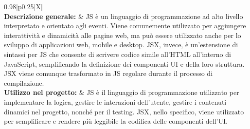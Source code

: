 \renewcommand{\arraystretch}{1.5}
\begin{xltabular}{0.98\textwidth}{|p{0.25\textwidth}|X|}
    \hline
     \\
    \hline
     \textbf{Descrizione generale:} & JS è un linguaggio di programmazione ad alto livello interpretato e orientato agli eventi. Viene comunemente utilizzato per aggiungere interattività e dinamicità alle pagine web, ma può essere utilizzato anche per lo sviluppo di applicazioni web, mobile e desktop. JSX, invece, è un'estensione di sintassi per JS che consente di scrivere codice simile all'HTML all'interno di JavaScript, semplificando la definizione dei componenti UI e della loro struttura. JSX viene comunque trasformato in JS regolare durante il processo di compilazione.\\
    \hline
     \textbf{Utilizzo nel progetto:} & JS è il linguaggio di programmazione utilizzato per implementare la logica, gestire le interazioni dell'utente, gestire i contenuti dinamici nel progetto, nonché per il testing. JSX, nello specifico, viene utilizzato per semplificare e rendere più leggibile la codifica delle componenti dell'UI.\\
    \hline

    \caption{Linguaggi di programmazione utilizzati}
    \label{tab:linguaggi}
\end{xltabular}

